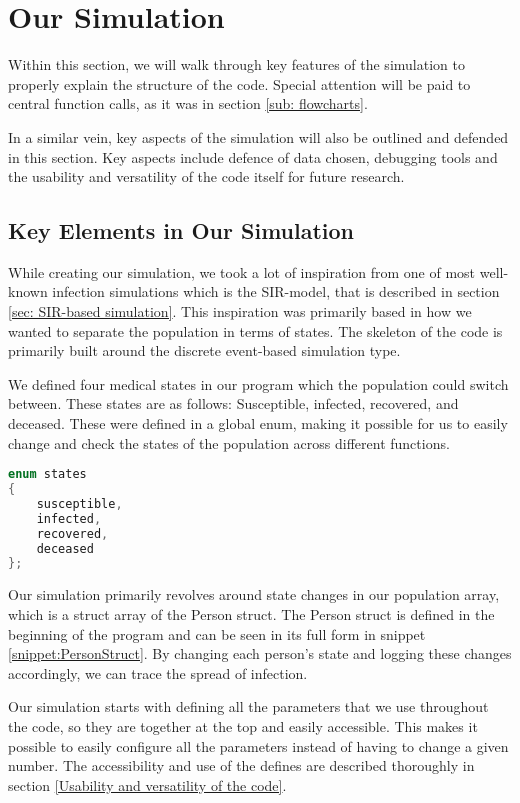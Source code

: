\section{Our Simulation}

Within this section, we will walk through key features of the simulation to properly explain the structure of the code. Special attention will be paid to central function calls, as it was in section \ref{sub: flowcharts}. 

In a similar vein, key aspects of the simulation will also be outlined and defended in this section. Key aspects include defence of data chosen, debugging tools and the usability and versatility of the code itself for future research.

\subsection{Key Elements in Our Simulation}
While creating our simulation, we took a lot of inspiration from one of most well-known infection simulations which is the SIR-model, that is described in section \ref{sec: SIR-based simulation}. This inspiration was primarily based in how we wanted to separate the population in terms of states. The skeleton of the code is primarily built around the discrete event-based simulation type.

We defined four medical states in our program which the population could switch between. These states are as follows: Susceptible, infected, recovered, and deceased. These were defined in a global enum, making it possible for us to easily change and check the states of the population across different functions.

\begin{lstlisting}[language=c, caption={Enum Medical States}, captionpos=b, label={snippet:EnumStates}]
enum states
{
    susceptible,
    infected,
    recovered,
    deceased
};
\end{lstlisting}

Our simulation primarily revolves around state changes in our population array, which is a struct array of the Person struct. The Person struct is defined in the beginning of the program and can be seen in its full form in snippet \vref{snippet:PersonStruct}. By changing each person's state and logging these changes accordingly, we can trace the spread of infection.

Our simulation starts with defining all the parameters that we use throughout the code, so they are together at the top and easily accessible. This makes it possible to easily configure all the parameters instead of having to change a given number. The accessibility and use of the defines are described thoroughly in section \vref{Usability and versatility of the code}.

